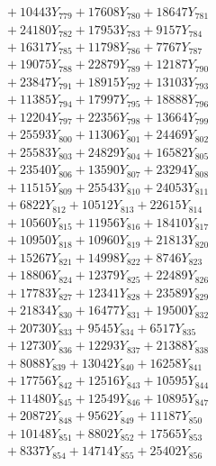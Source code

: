 \documentclass[a4paper,10pt]{article}
\begin{document}
{\begin{align}
&\;  + 10443 Y_{779} + 17608 Y_{780} + 18647 Y_{781} \\[0.3ex]
&\;  + 24180 Y_{782} + 17953 Y_{783} + 9157 Y_{784} \\[0.3ex]
&\;  + 16317 Y_{785} + 11798 Y_{786} + 7767 Y_{787} \\[0.3ex]
&\;  + 19075 Y_{788} + 22879 Y_{789} + 12187 Y_{790} \\[0.3ex]
&\;  + 23847 Y_{791} + 18915 Y_{792} + 13103 Y_{793} \\[0.3ex]
&\;  + 11385 Y_{794} + 17997 Y_{795} + 18888 Y_{796} \\[0.3ex]
&\;  + 12204 Y_{797} + 22356 Y_{798} + 13664 Y_{799} \\[0.3ex]
&\;  + 25593 Y_{800} + 11306 Y_{801} + 24469 Y_{802} \\[0.3ex]
&\;  + 25583 Y_{803} + 24829 Y_{804} + 16582 Y_{805} \\[0.3ex]
&\;  + 23540 Y_{806} + 13590 Y_{807} + 23294 Y_{808} \\[0.5ex]\allowbreak
&\;  + 11515 Y_{809} + 25543 Y_{810} + 24053 Y_{811} \\[0.3ex]
&\;  + 6822 Y_{812} + 10512 Y_{813} + 22615 Y_{814} \\[0.3ex]
&\;  + 10560 Y_{815} + 11956 Y_{816} + 18410 Y_{817} \\[0.3ex]
&\;  + 10950 Y_{818} + 10960 Y_{819} + 21813 Y_{820} \\[0.3ex]
&\;  + 15267 Y_{821} + 14998 Y_{822} + 8746 Y_{823} \\[0.3ex]
&\;  + 18806 Y_{824} + 12379 Y_{825} + 22489 Y_{826} \\[0.3ex]
&\;  + 17783 Y_{827} + 12341 Y_{828} + 23589 Y_{829} \\[0.3ex]
&\;  + 21834 Y_{830} + 16477 Y_{831} + 19500 Y_{832} \\[0.3ex]
&\;  + 20730 Y_{833} + 9545 Y_{834} + 6517 Y_{835} \\[0.3ex]
&\;  + 12730 Y_{836} + 12293 Y_{837} + 21388 Y_{838} \\[0.5ex]\allowbreak
&\;  + 8088 Y_{839} + 13042 Y_{840} + 16258 Y_{841} \\[0.3ex]
&\;  + 17756 Y_{842} + 12516 Y_{843} + 10595 Y_{844} \\[0.3ex]
&\;  + 11480 Y_{845} + 12549 Y_{846} + 10895 Y_{847} \\[0.3ex]
&\;  + 20872 Y_{848} + 9562 Y_{849} + 11187 Y_{850} \\[0.3ex]
&\;  + 10148 Y_{851} + 8802 Y_{852} + 17565 Y_{853} \\[0.3ex]
&\;  + 8337 Y_{854} + 14714 Y_{855} + 25402 Y_{856} \\[0.3ex]

\end{align}}
\end{document}
